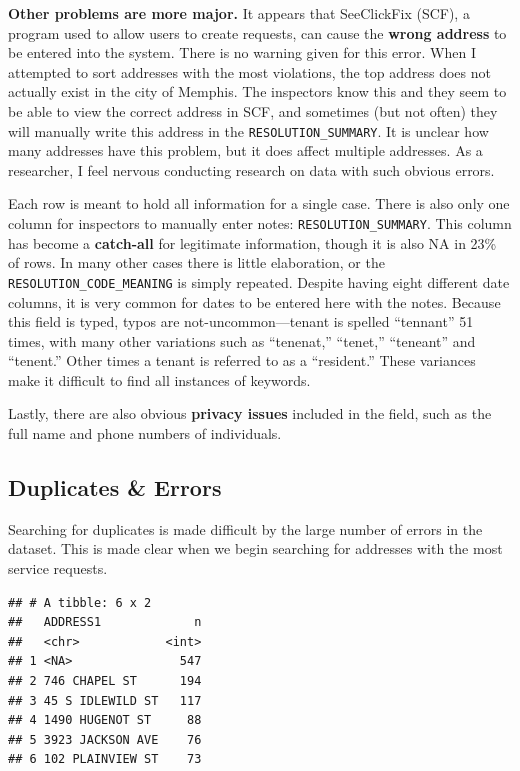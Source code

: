 \documentclass[
  openany]{book}
\begin{document}
\textbf{Other problems are more major.} It appears that SeeClickFix (SCF), a program used to allow users to create requests, can cause the \textbf{wrong address} to be entered into the system. There is no warning given for this error. When I attempted to sort addresses with the most violations, the top address does not actually exist in the city of Memphis. The inspectors know this and they seem to be able to view the correct address in SCF, and sometimes (but not often) they will manually write this address in the \texttt{RESOLUTION\_SUMMARY}. It is unclear how many addresses have this problem, but it does affect multiple addresses. As a researcher, I feel nervous conducting research on data with such obvious errors.

Each row is meant to hold all information for a single case. There is also only one column for inspectors to manually enter notes: \texttt{RESOLUTION\_SUMMARY}. This column has become a \textbf{catch-all} for legitimate information, though it is also NA in 23\% of rows. In many other cases there is little elaboration, or the \texttt{RESOLUTION\_CODE\_MEANING} is simply repeated. Despite having eight different date columns, it is very common for dates to be entered here with the notes. Because this field is typed, typos are not-uncommon---tenant is spelled ``tennant'' 51 times, with many other variations such as ``tenenat,'' ``tenet,'' ``teneant'' and ``tenent.'' Other times a tenant is referred to as a ``resident.'' These variances make it difficult to find all instances of keywords.

Lastly, there are also obvious \textbf{privacy issues} included in the field, such as the full name and phone numbers of individuals.

\hypertarget{duplicates-errors}{%
\subsection{Duplicates \& Errors}\label{duplicates-errors}}

Searching for duplicates is made difficult by the large number of errors in the dataset. This is made clear when we begin searching for addresses with the most service requests.

\begin{verbatim}
## # A tibble: 6 x 2
##   ADDRESS1             n
##   <chr>            <int>
## 1 <NA>               547
## 2 746 CHAPEL ST      194
## 3 45 S IDLEWILD ST   117
## 4 1490 HUGENOT ST     88
## 5 3923 JACKSON AVE    76
## 6 102 PLAINVIEW ST    73
\end{verbatim}
\end{document}
